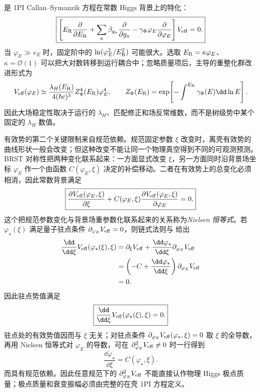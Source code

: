  是 1PI Callan--Symanzik 方程在常数 Higgs 背景上的特化：
\begin{equation}
\boxed{
\left[
E_{\rm R}\frac{\partial}{\partial E_{\rm R}}
+\sum_a\beta_{g_a}\frac{\partial}{\partial g_a}
-\gamma_\Phi\varphi_E\frac{\partial}{\partial\varphi_E}
\right]V_{\rm eff}=0.}
\label{eq:sm-effective-potential-rg-equation-dp12}
\end{equation}
当 $\varphi_E\gg v_E$ 时，固定阶中的 $\ln(\varphi_E^2/E_{\rm R}^2)$ 可能很大。选取 $E_{\rm R}=\kappa\varphi_E$、$\kappa=\mathcal O(1)$ 可以把大对数转移到运行耦合中；忽略质量项后，主导的重整化群改进形式为
\begin{equation*}
V_{\rm eff}(\varphi_E)
\simeq\frac{\lambda_H(E_{\rm R})}{4(\hbar c)^3}
Z_\Phi^4(E_{\rm R})\varphi_E^4,
\qquad
Z_\Phi(E_{\rm R})
=\exp\!\left[-\int^{E_{\rm R}}\gamma_\Phi(E)\dd\ln E\right].
\end{equation*}
因此大场稳定性取决于运行的 $\lambda_H$、匹配修正和场反常维数，而不是树级势中某个固定的 $\lambda_H$ 数值。

有效势的第二个关键限制来自规范依赖。规范固定参数 $\xi$ 改变时，离壳有效势的曲线形状一般会改变；但这种改变不能让同一个物理真空得到不同的可观测预测。BRST 对称性把两种变化联系起来：一方面显式改变 $\xi$，另一方面同时沿背景场坐标 $\varphi_E$ 作一个由函数 $C(\varphi_E,\xi)$ 决定的补偿移动。二者在有效势上的总变化必须相消，因此常数背景满足
\begin{equation}
\boxed{
\frac{\partial V_{\rm eff}(\varphi_E,\xi)}{\partial\xi}
+C(\varphi_E,\xi)
\frac{\partial V_{\rm eff}(\varphi_E,\xi)}{\partial\varphi_E}=0.}
\label{eq:sm-nielsen-identity-dp12}
\end{equation}
这个把规范参数变化与背景场重参数化联系起来的关系称为\emph{Nielsen 恒等式}。若 $\varphi_\star(\xi)$ 满足量子驻点条件 $\partial_{\varphi_E}V_{\rm eff}=0$，则链式法则与 给出
\begin{align*}
\frac{\dd}{\dd\xi}V_{\rm eff}(\varphi_\star(\xi),\xi)
&=\partial_\xi V_{\rm eff}
+\frac{\dd\varphi_\star}{\dd\xi}\partial_{\varphi_E}V_{\rm eff}\\
&=\left(-C+\frac{\dd\varphi_\star}{\dd\xi}\right)
\partial_{\varphi_E}V_{\rm eff}\\
&=0.
\end{align*}
因此驻点势值满足
\begin{equation}
\boxed{
\frac{\dd}{\dd\xi}
V_{\rm eff}(\varphi_\star(\xi),\xi)=0.}
\label{eq:sm-nielsen-stationary-value-dp68}
\end{equation}
驻点处的有效势值因而与 $\xi$ 无关；对驻点条件 $\partial_{\varphi_E}V_{\rm eff}(\varphi_\star,\xi)=0$ 取 $\xi$ 的全导数，再用 Nielsen 恒等式对 $\varphi_E$ 的导数，可在 $\partial_{\varphi_E}^2V_{\rm eff}\neq0$ 时一行得到
\begin{equation*}
\frac{\dd\varphi_\star}{\dd\xi}=C(\varphi_\star,\xi).
\end{equation*}
而具有规范依赖。因此任意规范下的 $\partial_{\varphi_E}^2V_{\rm eff}$ 不能直接认作物理 Higgs 极点质量；极点质量和衰变振幅必须由完整的在壳 1PI 方程定义。

